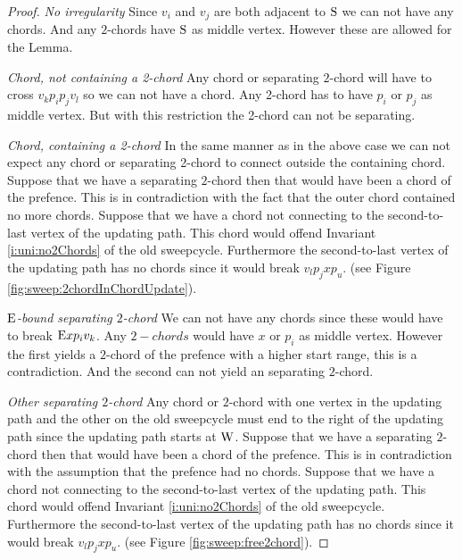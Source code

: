     \begin{proof}
      \emph{No irregularity}
      Since $v_i$ and $v_j$ are both adjacent to $\mathrm{S}$ we can not have any chords. And any $2$-chords have $\mathrm{S}$ as middle vertex. However these are allowed for the Lemma.

      \emph{Chord, not containing a 2-chord}
      Any chord or separating $2$-chord will have to cross $v_k p_i p_j v_l$ so we can not have a chord. Any 2-chord has to have $p_i$ or $p_j$ as middle vertex. But with this restriction the 2-chord can not be separating.

      \emph{Chord, containing a 2-chord}
      In the same manner as in the above case we can not expect any chord or separating 2-chord to connect outside the containing chord.
      Suppose that we have a separating $2$-chord then that would have been a chord of the prefence. This is in contradiction with the fact that the outer chord contained no more chords.
      Suppose that we have a chord not connecting to the second-to-last vertex of the updating path. This chord would offend Invariant \ref{i:uni:no2Chords} of the old sweepcycle. Furthermore the second-to-last vertex of the updating path has no chords since it would break $v_l p_j x p_u$. (see Figure \ref{fig:sweep:2chordInChordUpdate}).

      \emph{$\mathrm{E}$-bound separating $2$-chord}
      We can not have any chords since these would have to break $\mathrm{E} x p_i v_k$. Any $2-chords$ would have $x$ or $p_i$ as middle vertex. However the first yields a $2$-chord of the prefence with a higher start range, this is a contradiction. And the second can not yield an separating $2$-chord.


      \emph{Other separating $2$-chord}
      Any chord or $2$-chord with one vertex in the updating path and the other on the old sweepcycle must end to the right of the updating path since the updating path starts at $\mathrm{W}$.
      Suppose that we have a separating $2$-chord then that would have been a chord of the prefence. This is in contradiction with the assumption that the prefence had no chords.
      Suppose that we have a chord not connecting to the second-to-last vertex of the updating path. This chord would offend Invariant \ref{i:uni:no2Chords} of the old sweepcycle. Furthermore the second-to-last vertex of the updating path has no chords since it would break $v_l p_j x p_u$. (see Figure \ref{fig:sweep:free2chord}).
    \end{proof}

